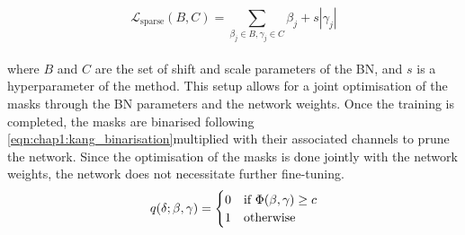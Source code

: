 

\DIFaddend \begin{equation}
 \mathcal{L}_{\text{{sparse}}}(B, C) = \sum_{\beta_j \in B, \gamma_j \in C} \beta_j + s|\gamma_j|
\end{equation}\\

\noindent where $B$ and $C$ are the set of shift and scale parameters of the
\ac{BN}, and $s$ is a hyperparameter of the method. This setup allows for a
joint optimisation of the masks through the \ac{BN} parameters and the network
weights. Once the training is completed, the masks are binarised following
\cref{eqn:chap1:kang_binarisation}\DIFdelbegin {}\DIFdelend \DIFaddbegin {}\DIFaddend multiplied with their associated channels to prune the network. Since the
optimisation of the masks is done jointly with the network weights, the network
does not necessitate further fine-tuning.\\


\begin{equation}
  \label{eqn:chap1:kang_binarisation}
  q(\delta;\beta,\gamma) = \DIFdelbegin %
\DIFdelend \DIFaddbegin \begin{cases}
    0 & \text{if } \Phi(\beta,\gamma) \geq c \\
    1 & \text{otherwise}
  \end{cases}\DIFaddend 
\end{equation}\\

